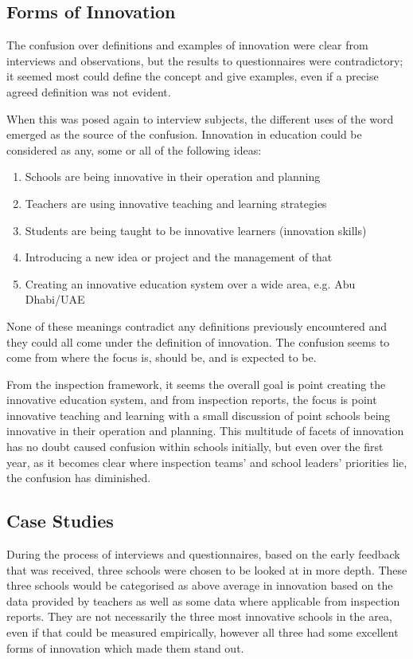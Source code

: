 \documentclass[11pt]{article}
\begin{document}
\subsection{Forms of Innovation}

The confusion over definitions and examples of innovation were clear from interviews and observations, but the results to questionnaires were contradictory; it seemed most could define the concept and give examples, even if a precise agreed definition was not evident.

When this was posed again to interview subjects, the different uses of the word emerged as the source of the confusion.
Innovation in education could be considered as any, some or all of the following ideas:
\begin{enumerate}
	\item Schools are being innovative in their operation and planning
	\item Teachers are using innovative teaching and learning strategies 
	\item Students are being taught to be innovative learners (innovation skills)
	\item Introducing a new idea or project and the management of that
	\item Creating an innovative education system over a wide area, e.g. Abu Dhabi/UAE
\end{enumerate}
None of these meanings contradict any definitions previously encountered and they could all come under the definition of innovation. The confusion seems to come from where the focus is, should be, and is expected to be. 

From the inspection framework, it seems the overall goal is point creating the innovative education system, and from inspection reports, the focus is point innovative teaching and learning with a small discussion of point schools being innovative in their operation and planning. This multitude of facets of innovation has no doubt caused confusion within schools initially, but even over the first year, as it becomes clear where inspection teams' and school leaders' priorities lie, the confusion has diminished.

\subsection{Case Studies}
During the process of interviews and questionnaires, based on the early feedback that was received, three schools were chosen to be looked at in more depth. These three schools would be categorised as above average in innovation based on the data provided by teachers as well as some data where applicable from inspection reports. They are not necessarily the three most innovative schools in the area, even if that could be measured empirically, however all three had some excellent forms of innovation which made them stand out.
\end{document}
